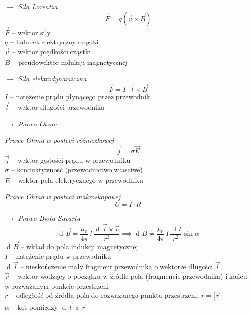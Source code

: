 \documentclass[12pt]{article}
\newenvironment{wzor}[1]{\par{\Large $\longrightarrow$ \textit{#1}}}
    {\newline {\color{grey} \rule{\linewidth}{0.3pt}}}
\DeclareMathOperator{\der}{\operatorname{d}\!}
\begin{document}
\begin{wzor}{Siła Lorentza}
    \begin{equation}
        \Vec{F} = q(\Vec{v} \times \Vec{B})
    \end{equation}
    $\Vec{F}$ -- wektor siły\\
    $q$ -- ładunek elektryczny cząstki\\
    $\Vec{v}$ -- wektor prędkości cząstki\\
    $\Vec{B}$ -- pseudowektor indukcji magnetycznej
\end{wzor}

\begin{wzor}{Siła elektrodynamiczna}
    \begin{equation}
        \Vec{F} = I \cdot \Vec{l} \times \Vec{B}
    \end{equation}
    $I$ -- natężenie prądu płynącego przez przewodnik\\
    $\Vec{l}$ -- wektor długości przewodnika
\end{wzor}

\newpage

\begin{wzor}{Prawo Ohma}
    \par \textit{Prawo Ohma w postaci różniczkowej}
    \begin{equation}
        \Vec{j} = \sigma \Vec{E}
    \end{equation}
    $\Vec{j}$ -- wektor gęstości prądu w przewodniku\\
    $\sigma$ -- konduktywność (przewodnictwo właściwe)\\
    $\Vec{E}$ -- wektor pola elektrycznego w przewodniku
    \par \textit{Prawo Ohma w postaci makroskopowej}
    \begin{equation}
        U = I \cdot R
    \end{equation}
\end{wzor}

\begin{wzor}{Prawo Biota-Savarta}
    \begin{equation}
        \der\Vec{B} = \frac{\mu_0}{4\pi} \, I \, \frac{\der\Vec{l}\times \Vec{r}}{r^3} \implies
        \der B = \frac{\mu_0}{4\pi} \, I \, \frac{\der l}{r^2} \, \sin \alpha
    \end{equation}
    $\der\Vec{B}$ -- wkład do pola indukcji magnetycznej\\
    $I$ -- natężenie prądu w przewodniku\\
    $\der\Vec{l}$ -- nieskończenie mały fragment przewodnika o wektorze długości $\Vec{l}$\\
    $\Vec{r}$ -- wektor wodzący o początku w źródle pola (fragmencie przewodnika)
        i końcu w rozważanym punkcie przestrzeni\\
    $r$ -- odległość od źródła pola do rozważanego punktu przestrzeni, $r = |\Vec{r}|$\\
    $\alpha$ -- kąt pomiędzy $\der\Vec{l}$ a $\Vec{r}$
\end{wzor}
\end{document}
